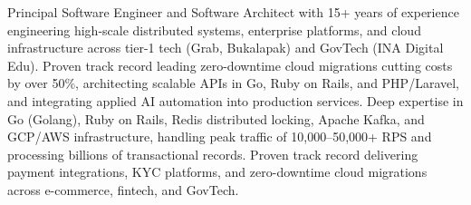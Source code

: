 \documentclass[11pt,a4paper,sans]{moderncv}
\begin{document}
\makecvtitle


\vspace{6pt}
\small{Principal Software Engineer and Software Architect with 15+ years of experience engineering high-scale distributed systems, enterprise platforms, and cloud infrastructure across tier-1 tech (Grab, Bukalapak) and GovTech (INA Digital Edu). Proven track record leading zero-downtime cloud migrations cutting costs by over 50\%, architecting scalable APIs in Go, Ruby on Rails, and PHP/Laravel, and integrating applied AI automation into production services. Deep expertise in Go (Golang), Ruby on Rails, Redis distributed locking, Apache Kafka, and GCP/AWS infrastructure, handling peak traffic of 10,000--50,000+ RPS and processing billions of transactional records. Proven track record delivering payment integrations, KYC platforms, and zero-downtime cloud migrations across e-commerce, fintech, and GovTech.}

\end{document}
